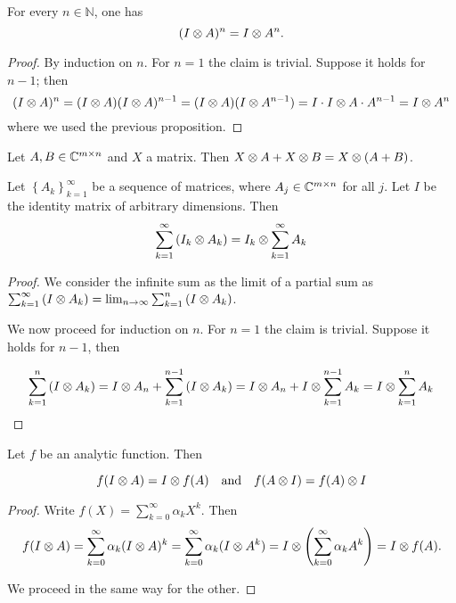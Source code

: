 \begin{lemma}
    For every $n \in \mathbb{N}$, one has
    \[
        (I \otimes A)^n = I \otimes A^n.
    \]
\end{lemma}

\begin{proof}
    By induction on $n$. For $n=1$ the claim is trivial. Suppose it holds for $n-1$; then
    \[
        (I \otimes A)^{n} = (I \otimes A)(I \otimes A)^{n-1} =(I \otimes A)(I \otimes A^{n-1}) = I \cdot I \otimes A \cdot A^{n-1} = I \otimes A^{n}
    \]
    where we used the previous proposition.
\end{proof}

\begin{lemma}
    Let $A,B \in \mathbb{C}^{m \times n}$ and $X$ a matrix. Then $X \otimes A + X \otimes B = X \otimes (A + B)$.
\end{lemma}

\begin{proposition}
    Let $\left\{A_k\right\}_{k = 1}^\infty$ be a sequence of matrices, where $A_j \in \mathbb{C}^{m \times n}$ for all $j$. Let $I$ be the identity matrix of arbitrary dimensions. Then 
    \[ \sum_{k = 1}^\infty \left(I_k \otimes A_k\right) = I_k \otimes \sum_{k = 1}^\infty A_k \]
\end{proposition}

\begin{proof}
    We consider the infinite sum as the limit of a partial sum as $\sum_{k = 1}^\infty \left(I \otimes A_k\right) = \lim_{n \to \infty} \sum_{k = 1}^n \left(I \otimes A_k\right)$.

    We now proceed for induction on $n$. For $n = 1$ the claim is trivial. Suppose it holds for $n-1$, then 

    \[
        \sum_{k = 1}^n \left(I \otimes A_k\right) = I \otimes A_n + \sum_{k = 1}^{n-1} \left(I \otimes A_k\right) = I \otimes A_n + I \otimes \sum_{k = 1}^{n-1} A_k = I \otimes \sum_{k = 1}^n A_k
    \]
\end{proof}

\begin{theorem}
    Let $f$ be an analytic function. Then

    \[
        f(I \otimes A) = I \otimes f(A) \quad \text{and} \quad f(A \otimes I) = f(A) \otimes I
    \]

    \label{th:analytic}
\end{theorem}

\begin{proof}
    Write $f(X) = \sum_{k=0}^\infty \alpha_k X^k$. Then
    \[
        f(I \otimes A) = \sum_{k=0}^\infty \alpha_k (I \otimes A)^k
        = \sum_{k=0}^\infty \alpha_k (I \otimes A^k)
        = I \otimes \left(\sum_{k=0}^\infty \alpha_k A^k\right)
        = I \otimes f(A).
    \]

    We proceed in the same way for the other.
\end{proof}



